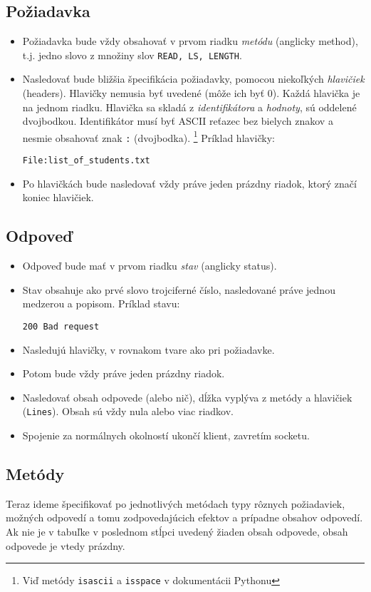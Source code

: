 \documentclass[11pt]{article}
\theoremstyle{definition}
\begin{document}
\subsection{Požiadavka}
\begin{itemize}
\item Požiadavka bude vždy obsahovať v prvom riadku \emph{metódu} (anglicky method), t.j. jedno slovo z množiny slov 
\texttt{READ, LS, LENGTH}.
\item Nasledovať bude bližšia špecifikácia požiadavky, pomocou niekoľkých \emph{hlavičiek}
(headers). Hlavičky nemusia byť uvedené (môže ich byť 0). Každá hlavička je na jednom
riadku. Hlavička sa skladá z \emph{identifikátora} a \emph{hodnoty}, sú oddelené dvojbodkou.
Identifikátor musí byť ASCII reťazec bez bielych znakov a nesmie obsahovať znak \texttt{:}
(dvojbodka).
\footnote{Viď metódy \texttt{isascii} a \texttt{isspace} v dokumentácii Pythonu}
Príklad hlavičky:
\begin{flushleft}
\texttt{File:list\_of\_students.txt}
\end{flushleft}
\item Po hlavičkách bude nasledovať vždy práve jeden prázdny riadok, ktorý značí koniec hlavičiek.
\end{itemize}

\subsection{Odpoveď}
\begin{itemize}
\item Odpoveď bude mať v prvom riadku \emph{stav} (anglicky status).
\item Stav obsahuje ako prvé slovo trojciferné číslo, nasledované práve jednou medzerou a popisom. Príklad stavu:
\begin{flushleft}
\texttt{200 Bad request}
\end{flushleft}
\item Nasledujú hlavičky, v rovnakom tvare ako pri požiadavke.
\item Potom bude vždy práve jeden prázdny riadok.
\item Nasledovať obsah odpovede (alebo nič), dĺžka vyplýva z metódy a hlavičiek (\texttt{Lines}). Obsah sú vždy nula alebo viac riadkov.
\item Spojenie za normálnych okolností ukončí klient, zavretím socketu.
\end{itemize}

\subsection{Metódy}
Teraz ideme špecifikovať po jednotlivých metódach typy rôznych požiadaviek, možných odpovedí a tomu
zodpovedajúcich efektov a prípadne obsahov odpovedí.
Ak nie je v tabuľke v poslednom stĺpci uvedený žiaden obsah odpovede, obsah odpovede
je vtedy prázdny.

\end{document}
